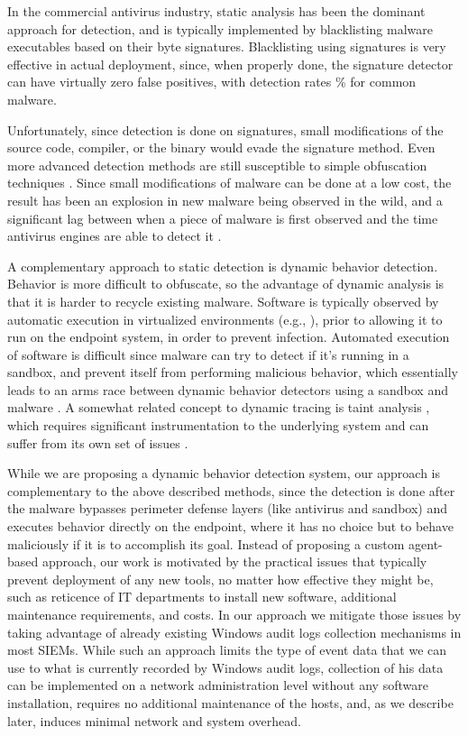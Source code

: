 \documentclass{sig-alternate-2013}
\newcommand{\eg}{e.g.\xspace}
\begin{document}
In the commercial antivirus industry, static analysis has been the dominant approach for detection, and is typically implemented by blacklisting malware executables based on their byte signatures.  Blacklisting using signatures is very effective in actual deployment, since, when properly done, the signature detector can have virtually zero false positives, with detection rates \% for common malware\cite{mohaisen2014av,avcompare2015}.

Unfortunately, since detection is done on signatures, small modifications of the source code, compiler, or the binary would evade the signature method. Even more advanced detection methods are still susceptible to simple obfuscation techniques \cite{moser2007limits}. Since small modifications of malware can be done at a low cost, the result has been an explosion in new malware being observed in the wild, and a significant lag between when a piece of malware is first observed and the time antivirus engines are able to detect it \cite{lastline2015}.

A complementary approach to static detection is dynamic behavior detection. Behavior is more difficult to obfuscate, so the advantage of dynamic analysis is that it is harder to recycle existing malware. Software is typically observed by automatic execution in virtualized environments (\eg, \cite{cuckoo2015}), prior to allowing it to run on the endpoint system, in order to prevent infection. Automated execution of software is difficult since malware can try to detect if it's running in a sandbox, and prevent itself from performing malicious behavior, which essentially leads to an arms race between dynamic behavior detectors using a sandbox and malware \cite{anubis2015,fleck2013pytrigger}. A somewhat related concept to dynamic tracing is taint analysis \cite{yin2007panorama,enck2014taintdroid}, which requires significant instrumentation to the underlying system and can suffer from its own set of issues \cite{slowinska2009pointless}.

While we are proposing a dynamic behavior detection system, our approach is complementary to the above described methods, since the detection is done after the malware bypasses perimeter defense layers (like antivirus and sandbox) and executes behavior directly on the endpoint, where it has no choice but to behave maliciously if it is to accomplish its goal. Instead of proposing a custom agent-based approach, our work is motivated by the practical issues that typically prevent deployment of any new tools, no matter how effective they might be, such as reticence of IT departments to install new software, additional maintenance requirements, and costs. In our approach we mitigate those issues by taking advantage of already existing Windows audit logs collection mechanisms in most SIEMs. While such an approach limits the type of event data that we can use to what is currently recorded by Windows audit logs, collection of his data can be implemented on a network administration level without any software installation, requires no additional maintenance of the hosts, and, as we describe later, induces minimal network and system overhead.
\end{document}
